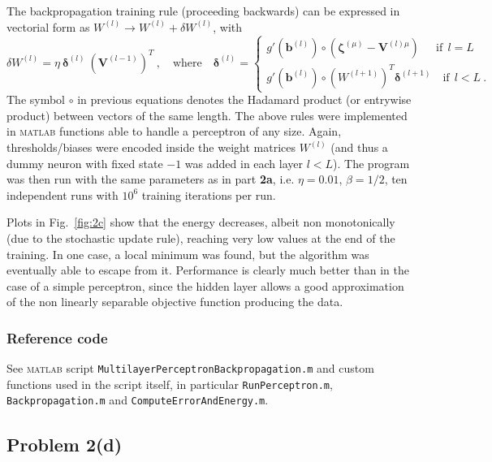 \documentclass[12pt,titlepage]{article}
\begin{document}
The backpropagation training rule (proceeding backwards) can be expressed in vectorial form as ${W^{(l)} \rightarrow W^{(l)} + \delta W^{(l)}}$, with
\begin{equation}
\delta W^{(l)} =  \eta \ \bm{\delta}^{(l)} \ (\bm{V}^{(l-1)})^T \ ,\quad \text{where} \quad \bm{\delta}^{(l)} =  \begin{cases} g'(\bm{b}^{(l)}) \circ (\bm{\zeta}^{(\mu)} - \bm{V}^{(l) \mu}) \quad \ \ \text{if} \ \ l=L \\ 
g'(\bm{b}^{(l)}) \circ (W^{(l+1)})^T \bm{\delta}^{(l+1)} \quad \text{if} \ \ l < L \ .\end{cases}
\end{equation}
The symbol $\circ$ in previous equations denotes the Hadamard product (or entrywise product) between vectors of the same length. The above rules were implemented in \textsc{matlab} functions able to handle a perceptron of any size. Again, thresholds/biases were encoded inside the weight matrices $W^{(l)}$ (and thus a dummy neuron with fixed state $-1$ was added in each layer $l<L$). The program was then run with the same parameters as in part \textbf{2a}, i.e. $\eta = 0.01$, $\beta = 1/2$, ten independent runs with $10^6$ training iterations per run.

Plots in Fig.~\ref{fig:2c} show that the energy decreases, albeit non monotonically (due to the stochastic update rule), reaching very low values at the end of the training. In one case, a local minimum was found, but the algorithm was eventually able to escape from it. Performance is clearly much better than in the case of a simple perceptron, since the hidden layer allows a good approximation of the non linearly separable objective function producing the data.

\vspace*{-0.3cm}
\subsubsection*{Reference code}
\vspace*{-0.2cm}
See \textsc{matlab} script \verb!MultilayerPerceptronBackpropagation.m! and custom functions used in the script itself, in particular \verb!RunPerceptron.m!, \verb!Backpropagation.m! and \verb!ComputeErrorAndEnergy.m!.
\enlargethispage{\baselineskip}

\clearpage

\restoregeometry


\subsection*{Problem 2(d)}
\end{document}
